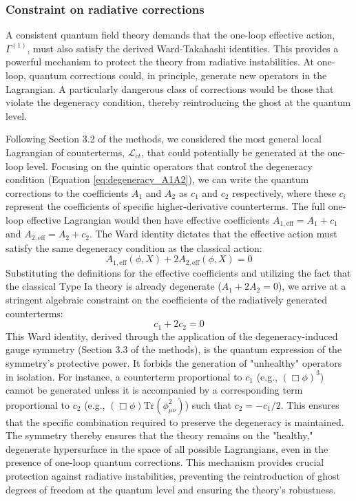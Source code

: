 \documentclass[twocolumn]{aastex631}
\begin{document}
\subsubsection{Constraint on radiative corrections}
A consistent quantum field theory demands that the one-loop effective action, $\Gamma^{(1)}$, must also satisfy the derived Ward-Takahashi identities. This provides a powerful mechanism to protect the theory from radiative instabilities. At one-loop, quantum corrections could, in principle, generate new operators in the Lagrangian. A particularly dangerous class of corrections would be those that violate the degeneracy condition, thereby reintroducing the ghost at the quantum level.

Following Section 3.2 of the methods, we considered the most general local Lagrangian of counterterms, $\mathcal{L}_{ct}$, that could potentially be generated at the one-loop level. Focusing on the quintic operators that control the degeneracy condition (Equation \ref{eq:degeneracy_A1A2}), we can write the quantum corrections to the coefficients $A_1$ and $A_2$ as $c_1$ and $c_2$ respectively, where these $c_i$ represent the coefficients of specific higher-derivative counterterms. The full one-loop effective Lagrangian would then have effective coefficients $A_{1, \text{eff}} = A_1 + c_1$ and $A_{2, \text{eff}} = A_2 + c_2$. The Ward identity dictates that the effective action must satisfy the same degeneracy condition as the classical action:
\begin{equation} \label{eq:quantum_degeneracy_condition}
    A_{1, \text{eff}}(\phi, X) + 2 A_{2, \text{eff}}(\phi, X) = 0
\end{equation}
Substituting the definitions for the effective coefficients and utilizing the fact that the classical Type Ia theory is already degenerate ($A_1 + 2A_2 = 0$), we arrive at a stringent algebraic constraint on the coefficients of the radiatively generated counterterms:
\begin{equation} \label{eq:counterterm_constraint}
    c_1 + 2c_2 = 0
\end{equation}
This Ward identity, derived through the application of the degeneracy-induced gauge symmetry (Section 3.3 of the methods), is the quantum expression of the symmetry's protective power. It forbids the generation of "unhealthy" operators in isolation. For instance, a counterterm proportional to $c_1$ (e.g., $(\Box\phi)^3$) cannot be generated unless it is accompanied by a corresponding term proportional to $c_2$ (e.g., $(\Box\phi)\text{Tr}(\phi_{\mu\nu}^2)$) such that $c_2 = -c_1/2$. This ensures that the specific combination required to preserve the degeneracy is maintained. The symmetry thereby ensures that the theory remains on the "healthy," degenerate hypersurface in the space of all possible Lagrangians, even in the presence of one-loop quantum corrections. This mechanism provides crucial protection against radiative instabilities, preventing the reintroduction of ghost degrees of freedom at the quantum level and ensuring the theory's robustness.
\end{document}
